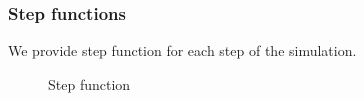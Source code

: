 \documentclass{article}
\begin{document}
\begin{normalsize}
\subsubsection{Step functions}
We provide step function for each step of the simulation. 
\begin{figure}[H]
	\caption{Step function}
\end{figure}


\end{normalsize}
\end{document}
